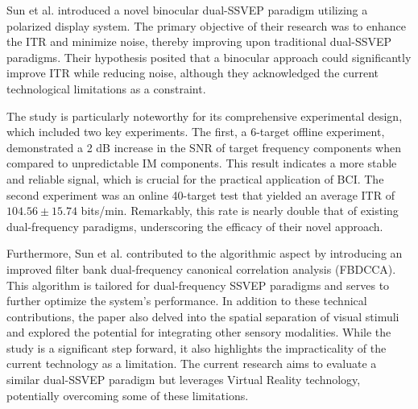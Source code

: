 Sun et al. \cite{sun2023binocular} introduced a novel binocular dual-SSVEP  paradigm utilizing a polarized display system. The primary objective of their research was to enhance the ITR and minimize noise, thereby improving upon traditional dual-SSVEP paradigms. Their hypothesis posited that a binocular approach could significantly improve ITR while reducing noise, although they acknowledged the current technological limitations as a constraint. 

The study is particularly noteworthy for its comprehensive experimental design, which included two key experiments. The first, a 6-target offline experiment, demonstrated a 2 dB increase in the SNR of target frequency components when compared to unpredictable IM components. This result indicates a more stable and reliable signal, which is crucial for the practical application of BCI. The second experiment was an online 40-target test that yielded an average ITR of \(104.56 \pm 15.74\) bits/min. Remarkably, this rate is nearly double that of existing dual-frequency paradigms, underscoring the efficacy of their novel approach.

Furthermore, Sun et al. contributed to the algorithmic aspect by introducing an improved filter bank dual-frequency canonical correlation analysis (FBDCCA). This algorithm is tailored for dual-frequency SSVEP paradigms and serves to further optimize the system's performance. In addition to these technical contributions, the paper also delved into the spatial separation of visual stimuli and explored the potential for integrating other sensory modalities. While the study is a significant step forward, it also highlights the impracticality of the current technology as a limitation. The current research aims to evaluate a similar dual-SSVEP paradigm but leverages Virtual Reality technology, potentially overcoming some of these limitations.
